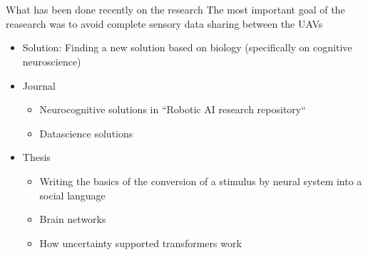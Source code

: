 \section{}
    \begin{frame}[allowframebreaks]{What has been done recently on the research}
        The most important goal of the reasearch was to avoid complete sensory data sharing between the UAVs
        \begin{itemize}
            \item Solution: Finding a new solution based on biology (specifically on cognitive neuroscience)
        \end{itemize}
        \begin{itemize}
            \item Journal
            \begin{itemize}
                \item Neurocognitive solutions in ``Robotic AI research repository`` 
                \item Datascience solutions 
            \end{itemize}
            \item Thesis
            \begin{itemize}
                \item Writing the basics of the conversion of a stimulus by neural system into a social language
                \item Brain networks
                \item How uncertainty supported transformers work
            \end{itemize}
        \end{itemize}
    \end{frame}
    
    \subsection{}
        
        